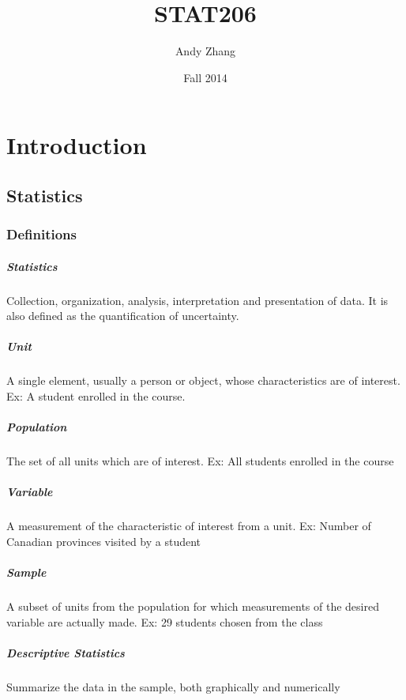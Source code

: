 \documentclass[12pt]{report}
\title{STAT206}
\author{{Andy Zhang}}
\date{{Fall 2014}}
\begin{document}
\maketitle
\tableofcontents
\chapter{Introduction}
  \section{Statistics}
    \subsection{Definitions}
      \paragraph{Statistics}
      Collection, organization, analysis,
      interpretation and presentation of data. It is also defined as the
      quantification of uncertainty.

      \paragraph{Unit} A single element, usually a person or object, whose
      characteristics are of interest. Ex: A student enrolled in the course.

      \paragraph{Population} The set of all units which are of interest. Ex:
      All students enrolled in the course

      \paragraph{Variable} A measurement of the characteristic of interest
      from a unit. Ex: Number of Canadian provinces visited by a student

      \paragraph{Sample} A subset of units from the population for which
      measurements of the desired variable are actually made. Ex: 29 students
      chosen from the class

      \paragraph{Descriptive Statistics} Summarize the data in the sample, both
      graphically and numerically
\end{document}
